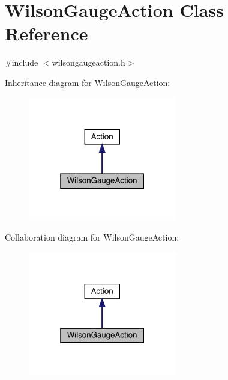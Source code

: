 \hypertarget{class_wilson_gauge_action}{}\section{Wilson\+Gauge\+Action Class Reference}
\label{class_wilson_gauge_action}


{\ttfamily \#include $<$wilsongaugeaction.\+h$>$}



Inheritance diagram for Wilson\+Gauge\+Action\+:\nopagebreak
\begin{figure}[H]
\begin{center}
\leavevmode
\includegraphics[width=184pt]{class_wilson_gauge_action__inherit__graph}
\end{center}
\end{figure}


Collaboration diagram for Wilson\+Gauge\+Action\+:\nopagebreak
\begin{figure}[H]
\begin{center}
\leavevmode
\includegraphics[width=184pt]{class_wilson_gauge_action__coll__graph}
\end{center}
\end{figure}
